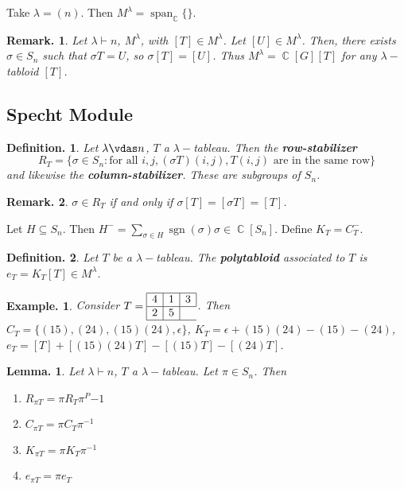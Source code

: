 \documentclass[11pt, a4paper]{memoir}
\DeclareMathOperator{\C}{{\mathbb{C}}}
\theoremstyle{change}
\newtheorem{lemma}[theorem]{Lemma.}
\theoremstyle{plain}
\theoremstyle{nonumberplain}
\newtheorem{definition}{Definition.}
\newtheorem{example}{Example.}
\newtheorem{remark}{Remark.}
\DeclareMathOperator{\spn}{span}
\DeclareMathOperator{\sgn}{sgn}
\numberwithin{equation}{section}
\begin{document}
Take $\lambda=(n)$.
Then $M^\lambda=\spn_{\C}\{\}$.
\begin{remark}
    Let $\lambda\vdash n$, $M^\lambda$, with $[T]\in M^\lambda$.
    Let $[U]\in M^\lambda$.
    Then, there exists $\sigma\in S_n$ such that $\sigma T=U$, so $\sigma[T]=[U]$.
    Thus $M^\lambda=\C[G][T]$ for any $\lambda-$tabloid $[T]$.
\end{remark}
\subsection{Specht Module}
\begin{definition}
    Let $\lambda\vdas n$, $T$ a $\lambda-$tableau.
    Then the \textbf{row-stabilizer}
    \begin{equation*}
        R_T=\{\sigma\in S_n:\text{for all }i,j,(\sigma T)(i,j),T(i,j)\text{ are in the same row}\}
    \end{equation*}
    and likewise the \textbf{column-stabilizer}.
    These are subgroups of $S_n$.
\end{definition}
\begin{remark}
    $\sigma\in R_T$ if and only if $\sigma[T]=[\sigma T]=[T]$.
\end{remark}
Let $H\subseteq S_n$.
Then $H^-=\sum_{\sigma\in H}\sgn(\sigma)\sigma\in\C[S_n]$.
Define $K_T=C_T^-$.
\begin{definition}
    Let $T$ be a $\lambda-$tableau.
    The \textbf{polytabloid} associated to $T$ is $e_T=K_T[T]\in M^\lambda$.
\end{definition}
\begin{example}
    Consider $T=\begin{array}{|c|c|c|}\hline 4&1&3\\\hline 2&5\\\hline\end{array}$.
    Then $C_T=\{(15),(24),(15)(24),\epsilon\}$, $K_T=\epsilon+(15)(24)-(15)-(24)$, $e_T=[T]+[(15)(24)T]-[(15)T]-[(24)T]$.
\end{example}
\begin{lemma}
    Let $\lambda\vdash n$, $T$ a $\lambda-$tableau.
    Let $\pi\in S_n$.
    Then
    \begin{enumerate}[nl]
        \item $R_{\pi T}=\pi R_T\pi^P{-1}$
        \item $C_{\pi T}=\pi C_T\pi^{-1}$
        \item $K_{\pi T}=\pi K_T\pi^{-1}$
        \item $e_{\pi T}=\pi e_T$
    \end{enumerate}
\end{lemma}
\end{document}
